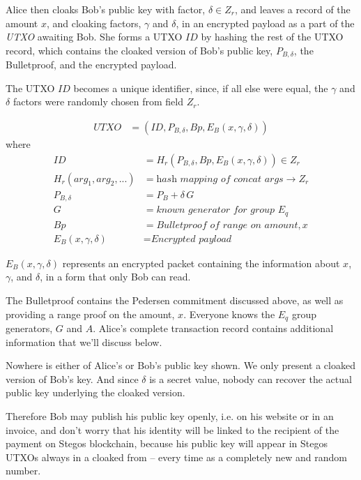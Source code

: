 \documentclass[a4paper, 10pt, conference]{ieeeconf}
\begin{document}
Alice then cloaks Bob's public key with factor, $\delta \in Z_r$, and leaves a record of the amount $x$, and cloaking factors, $\gamma$ and $\delta$, in an encrypted payload as a part of the \textit{UTXO} awaiting Bob. She forms a UTXO $\mathit{ID}$ by hashing the rest of the UTXO record, which contains the cloaked version of Bob's public key, $P_{B, \delta}$, the Bulletproof, and the encrypted payload. 

The UTXO $\mathit{ID}$ becomes a unique identifier, since, if all else were equal, the $\gamma$ and $\delta$ factors were randomly chosen from field $Z_r$.

\begin{align*}
UTXO &= (ID, P_{B, \delta}, Bp, E_B(x, \gamma, \delta))
\end{align*}
where
\begin{align*}
ID &= H_r(P_{B, \delta}, Bp, E_B(x, \gamma, \delta)) \in Z_r \\
H_r(arg_1, arg_2, ...) &= \textit{hash mapping of concat args} \rightarrow Z_r \\
P_{B, \delta} &= P_B + \delta \, G \\
G &= \textit{known generator for group } E_q \\
Bp &= \textit{Bulletproof of range on amount}, x \\
E_B(x, \gamma, \delta) &= \textit{Encrypted payload}
\end{align*}

$E_B(x, \gamma, \delta)$ represents an encrypted packet containing the information about $x$, $\gamma$, and $\delta$, in a form that only Bob can read.

The Bulletproof contains the Pedersen commitment discussed above, as well as providing a range proof on the amount, $x$. Everyone knows the $E_q$ group generators, $G$ and $A$. Alice's complete transaction record contains additional information that we'll discuss below.

Nowhere is either of Alice's or Bob's public key shown. We only present a cloaked version of Bob's key. And since $\delta$ is a secret value, nobody can recover the actual public key underlying the cloaked version. 

Therefore Bob may publish his public key openly, i.e. on his website or in an  invoice, and don't worry that his identity will be linked to the recipient of the payment on Stegos blockchain, because his public key will appear in Stegos UTXOs always in a cloaked from -- every time as a completely new and random number.
\end{document}
